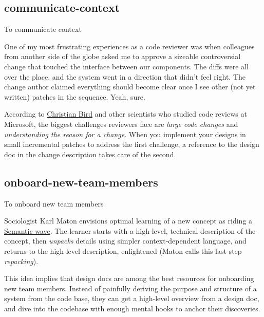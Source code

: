 \documentclass{article}
\begin{document}
\subsection{communicate-context}{To communicate context}

One of my most frustrating experiences as a code reviewer was when colleagues from another side of the globe asked me to approve a sizeable controversial change that touched the interface between our components.
The diffs were all over the place, and the system went in a direction that didn't feel right.
The change author claimed everything should become clear once I see other (not yet written) patches in the sequence.
Yeah, sure.

According to \href{https://www.cabird.com/}{Christian Bird} and other scientists who studied code reviews at Microsoft, the biggest challenges reviewers face are \emph{large code changes} and \emph{understanding the reason for a change}.
When you implement your designs in small incremental patches to address the first challenge, a reference to the design doc in the change description takes care of the second.

\subsection{onboard-new-team-members}{To onboard new team members}

Sociologist Karl Maton envisions optimal learning of a new concept as riding a \href{https://www.researchgate.net/publication/294799589_Semantic_waves_Context_complexity_and_academic_discourse}{Semantic wave}.
The learner starts with a high-level, technical description of the concept, then \emph{unpacks} details using simpler context-dependent language, and returns to the high-level description, enlightened (Maton calls this last step \emph{repacking}).

This idea implies that design docs are among the best resources for onboarding new team members.
Instead of painfully deriving the purpose and structure of a system from the code base,
they can get a high-level overview from a design doc,
and dive into the codebase with enough mental hooks to anchor their discoveries.
\end{document}
